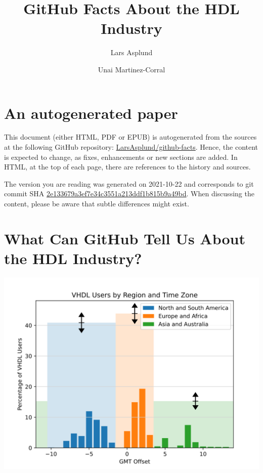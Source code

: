 \documentclass[]{article}
\title{GitHub Facts About the HDL Industry}
\author{Lars Asplund \and Unai Martinez-Corral}
\date{}
\begin{document}
\maketitle

{
\setcounter{tocdepth}{4}
\tableofcontents
}
\listoffigures


\hypertarget{an-autogenerated-paper}{%
\section*{An autogenerated paper}\label{an-autogenerated-paper}}

This document (either HTML, PDF or EPUB) is autogenerated from the sources at the following GitHub repository: \href{https://github.com/LarsAsplund/github-facts}{LarsAsplund/github-facts}. Hence, the content is expected to change, as fixes, enhancements or new sections are added. In HTML, at the top of each page, there are references to the history and sources.

The version you are reading was generated on 2021-10-22 and corresponds to git commit SHA \href{https://github.com/LarsAsplund/github-facts/commit/2e133679a3ef7e34c3551a213ddf1b815b9a49bd}{2e133679a3ef7e34c3551a213ddf1b815b9a49bd}. When discussing the content, please be aware that subtle differences might exist.

\hypertarget{index}{%
\section{What Can GitHub Tell Us About the HDL Industry?}\label{index}}

\begin{center}\includegraphics[width=0.85\linewidth]{img/vhdl_timezone_chart} \end{center}
\end{document}
